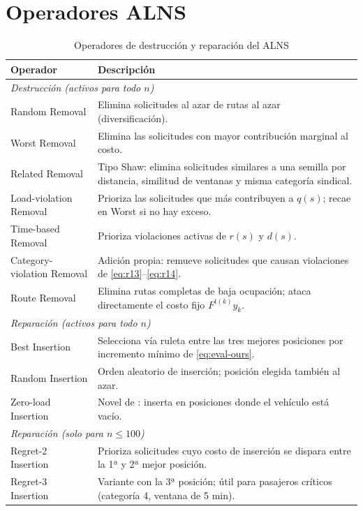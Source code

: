 \clearpage
\section{Operadores ALNS}
\label{anexo:operadores}

\begin{table}[h]
\centering
\caption{Operadores de destrucción y reparación del ALNS}
\label{tab:operadores}
\vspace{0.5em}
\begin{tabular*}{\textwidth}{@{\extracolsep{\fill}} l p{8.5cm} @{}}
\toprule
\textbf{Operador} & \textbf{Descripción} \\ \midrule
\multicolumn{2}{l}{\textit{Destrucción (activos para todo $n$)}} \\ \addlinespace
Random Removal & Elimina solicitudes al azar de rutas al azar (diversificación). \\ \addlinespace
Worst Removal & Elimina las solicitudes con mayor contribución marginal al costo. \\ \addlinespace
Related Removal & Tipo Shaw: elimina solicitudes similares a una semilla por distancia, similitud de ventanas y misma categoría sindical. \\ \addlinespace
Load-violation Removal & Prioriza las solicitudes que más contribuyen a $q(s)$; recae en Worst si no hay exceso. \\ \addlinespace
Time-based Removal & Prioriza violaciones activas de $r(s)$ y $d(s)$. \\ \addlinespace
Category-violation Removal & Adición propia: remueve solicitudes que causan violaciones de \eqref{eq:r13}--\eqref{eq:r14}. \\ \addlinespace
Route Removal & Elimina rutas completas de baja ocupación; ataca directamente el costo fijo $F^{t(k)} y_k$. \\ \midrule
\multicolumn{2}{l}{\textit{Reparación (activos para todo $n$)}} \\ \addlinespace
Best Insertion & Selecciona vía ruleta entre las tres mejores posiciones por incremento mínimo de \eqref{eq:eval-ours}. \\ \addlinespace
Random Insertion & Orden aleatorio de inserción; posición elegida también al azar. \\ \addlinespace
Zero-load Insertion & Novel de \cite{Pilati2025}: inserta en posiciones donde el vehículo está vacío. \\ \midrule
\multicolumn{2}{l}{\textit{Reparación (solo para $n \leq 100$)}} \\ \addlinespace
Regret-2 Insertion & Prioriza solicitudes cuyo costo de inserción se dispara entre la 1ª y 2ª mejor posición. \\ \addlinespace
Regret-3 Insertion & Variante con la 3ª posición; útil para pasajeros críticos (categoría 4, ventana de 5 min). \\ \bottomrule
\end{tabular*}
\end{table}



